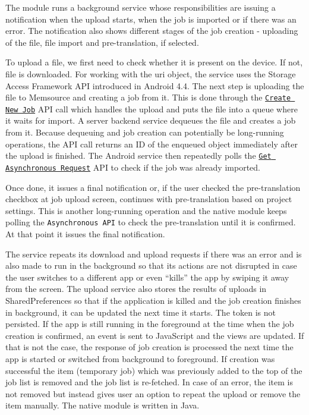 

The module runs a background service whose responsibilities are issuing a notification when the upload starts, when the job is imported or if there was an error. The notification also shows different stages of the job creation - uploading of the file, file import and pre-translation, if selected. 

To upload a file, we first need to check whether it is present on the device. If not, file is downloaded. For working with the uri object, the service uses the Storage Access Framework API introduced in Android 4.4. The next step is uploading the file to Memsource and creating a job from it. This is done through  the \href{http://wiki.memsource.com/wiki/Job_Asynchronous_API_v2#Create_New_Job}{\texttt{Create New Job}} API call which handles the upload and puts the file into a queue where it waits for import. A server backend service dequeues the file and creates a job from it. Because dequeuing and job creation can potentially be long-running operations, the API call returns an ID of the enqueued object immediately after the upload is finished. The Android service then repeatedly polls the \href{http://wiki.memsource.com/wiki/Asynchronous_API_v2#Get_Asynchronous_Request}{\texttt{Get Asynchronous Request}} API to check if the job was already imported.

Once done, it issues a final notification or, if the user checked the pre-translation checkbox at job upload screen, continues with pre-translation based on project settings. This is another long-running operation and the native module keeps polling the \texttt{Asynchronous API} to check the pre-translation until it is confirmed. At that point it issues the final notification.


The service repeats its download and upload requests if there was an error and is also made to run in the background so that its actions are not disrupted in case the user switches to a different app or even “kills” the app by swiping it away from the screen. The upload service also stores the results of uploads in SharedPreferences so that if the application is killed and the job creation finishes in background, it can be updated the next time it starts. The token is not persisted.
If the app is still running in the foreground at the time when the job creation is confirmed, an event is sent to JavaScript and the views are updated. If that is not the case, the response of job creation is processed the next time the app is started or switched from background to foreground. If creation was successful the item (temporary job) which was previously added to the top of the job list is removed and the job list is re-fetched. In case of an error, the item is not removed but instead gives user an option to repeat the upload or remove the item manually. The native module is written in Java. 
 

